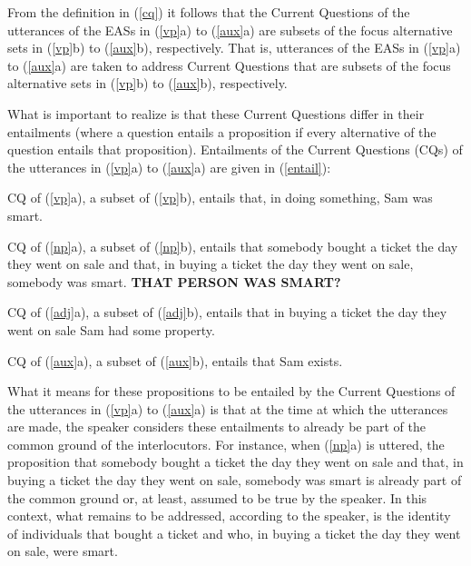 \documentclass[11pt,fleqn]{article}
\newcommand{\6}{\mbox{$[\hspace*{-.6mm}[$}}
\newcommand{\9}{\mbox{$]\hspace*{-.6mm}]$}}
\begin{document}
From the definition in (\ref{cq}) it follows that the Current Questions of the utterances of the EASs in (\ref{vp}a) to (\ref{aux}a) are subsets of the focus alternative sets in (\ref{vp}b) to (\ref{aux}b), respectively. That is, utterances of the EASs in (\ref{vp}a) to (\ref{aux}a) are taken to address Current Questions that are subsets of the focus alternative sets in (\ref{vp}b) to (\ref{aux}b), respectively.

What is important to realize is that these Current Questions differ in their entailments (where a question entails a proposition if every alternative of the question entails that proposition). Entailments of the Current Questions (CQs) of the utterances in (\ref{vp}a) to (\ref{aux}a) are given in (\ref{entail}):

\begin{exe}
\ex\label{entail}

\begin{xlist}

\ex CQ of (\ref{vp}a), a subset of (\ref{vp}b), entails that, in doing something, Sam was smart.

\ex CQ of (\ref{np}a), a subset of (\ref{np}b), entails that somebody bought a ticket the day they went on sale and that, in buying a ticket the day they went on sale, somebody was smart. {\bf THAT PERSON WAS SMART?}

\ex CQ of (\ref{adj}a), a subset of (\ref{adj}b), entails that in buying a ticket the day they went on sale Sam had some property.

\ex CQ of (\ref{aux}a), a subset of (\ref{aux}b), entails that Sam exists.

\end{xlist}

\end{exe}
What it means for these propositions to be entailed by the Current Questions of the utterances in (\ref{vp}a) to (\ref{aux}a) is that at the time at which the utterances are made, the speaker considers these entailments to already be part of the common ground of the interlocutors. For instance, when (\ref{np}a) is uttered, the proposition that somebody bought a ticket the day they went on sale and that, in buying a ticket the day they went on sale, somebody was smart is already part of the common ground or, at least, assumed to be true by the speaker. In this context, what remains to be addressed, according to the speaker, is the identity of individuals that bought a ticket and who, in buying a ticket the day they went on sale, were smart.
\end{document}
